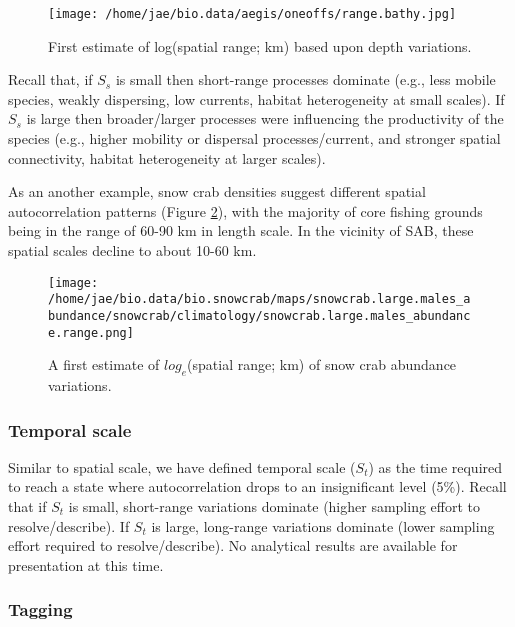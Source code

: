 \documentclass[letterpaper,portrait,11pt]{scrartcl}
\numberwithin{equation}{section}    %
\numberwithin{figure}{section}    %
\numberwithin{table}{section}       %
\begin{document}
\begin{figure}[ht]
  \centering
  \texttt{[image: /home/jae/bio.data/aegis/oneoffs/range.bathy.jpg]}
  \caption{First estimate of log(spatial range; km) based upon depth variations.}
    \label{fig:spatialrangeBathy}
\end{figure}

Recall that, if $S_s$ is small then short-range processes dominate (e.g., less mobile species, weakly dispersing, low currents, habitat heterogeneity at small scales).  If $S_s$ is large then broader/larger processes were influencing the productivity of the species (e.g., higher mobility or dispersal processes/current, and stronger spatial connectivity, habitat heterogeneity at larger scales). 

As an another example, snow crab densities suggest different spatial autocorrelation patterns (Figure \ref{fig:spatialrangeSnowcrab}), with the majority of core fishing grounds being in the range of 60-90 km in length scale. In the vicinity of SAB, these spatial scales decline to about 10-60 km. 

\begin{figure}[h]
  \centering
  \texttt{[image: /home/jae/bio.data/bio.snowcrab/maps/snowcrab.large.males\_abundance/snowcrab/climatology/snowcrab.large.males\_abundance.range.png]}
  \caption{A first estimate of $log_e$(spatial range; km) of snow crab abundance variations.}
  \label{fig:spatialrangeSnowcrab}
\end{figure}


\subsubsection{Temporal scale}

Similar to spatial scale, we have defined temporal scale ($S_t$) as the time required to reach a state where autocorrelation drops to an insignificant level (5\%). Recall that if $S_t$ is small, short-range variations dominate (higher sampling effort to resolve/describe). If $S_t$ is large, long-range variations dominate (lower sampling effort required to resolve/describe). No analytical results are available for presentation at this time.



\subsubsection{Tagging}
\end{document}
